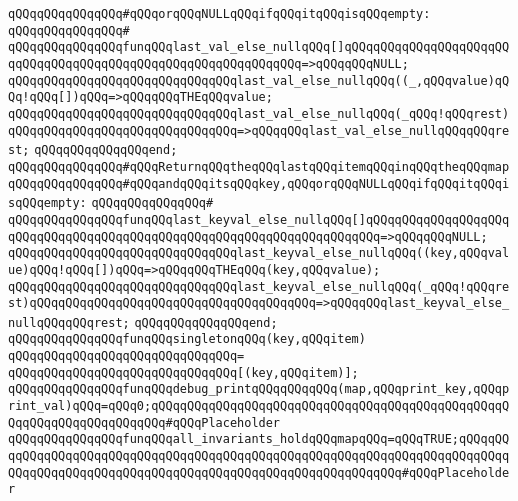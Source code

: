 \verb|qQQqqQQqqQQqqQQq#qQQqorqQQqNULLqQQqifqQQqitqQQqisqQQqempty:|\newline
\verb|qQQqqQQqqQQqqQQq#|\newline
\verb|qQQqqQQqqQQqqQQqfunqQQqlast_val_else_nullqQQq[]qQQqqQQqqQQqqQQqqQQqqQQqqQQqqQQqqQQqqQQqqQQqqQQqqQQqqQQqqQQqqQQq=>qQQqqQQqNULL;|\newline
\verb|qQQqqQQqqQQqqQQqqQQqqQQqqQQqqQQqlast_val_else_nullqQQq((_,qQQqvalue)qQQq!qQQq[])qQQq=>qQQqqQQqTHEqQQqvalue;|\newline
\verb|qQQqqQQqqQQqqQQqqQQqqQQqqQQqqQQqlast_val_else_nullqQQq(_qQQq!qQQqrest)qQQqqQQqqQQqqQQqqQQqqQQqqQQqqQQq=>qQQqqQQqlast_val_else_nullqQQqqQQqrest;|\newline
\verb|qQQqqQQqqQQqqQQqend;|\newline
\newline
\verb|qQQqqQQqqQQqqQQq#qQQqReturnqQQqtheqQQqlastqQQqitemqQQqinqQQqtheqQQqmap|\newline
\verb|qQQqqQQqqQQqqQQq#qQQqandqQQqitsqQQqkey,qQQqorqQQqNULLqQQqifqQQqitqQQqisqQQqempty:|\newline
\verb|qQQqqQQqqQQqqQQq#|\newline
\verb|qQQqqQQqqQQqqQQqfunqQQqlast_keyval_else_nullqQQq[]qQQqqQQqqQQqqQQqqQQqqQQqqQQqqQQqqQQqqQQqqQQqqQQqqQQqqQQqqQQqqQQqqQQqqQQq=>qQQqqQQqNULL;|\newline
\verb|qQQqqQQqqQQqqQQqqQQqqQQqqQQqqQQqlast_keyval_else_nullqQQq((key,qQQqvalue)qQQq!qQQq[])qQQq=>qQQqqQQqTHEqQQq(key,qQQqvalue);|\newline
\verb|qQQqqQQqqQQqqQQqqQQqqQQqqQQqqQQqlast_keyval_else_nullqQQq(_qQQq!qQQqrest)qQQqqQQqqQQqqQQqqQQqqQQqqQQqqQQqqQQqqQQq=>qQQqqQQqlast_keyval_else_nullqQQqqQQqrest;|\newline
\verb|qQQqqQQqqQQqqQQqend;|\newline
\newline
\verb|qQQqqQQqqQQqqQQqfunqQQqsingletonqQQq(key,qQQqitem)|\newline
\verb|qQQqqQQqqQQqqQQqqQQqqQQqqQQqqQQq=|\newline
\verb|qQQqqQQqqQQqqQQqqQQqqQQqqQQqqQQq[(key,qQQqitem)];|\newline
\newline
\verb|qQQqqQQqqQQqqQQqfunqQQqdebug_printqQQqqQQqqQQq(map,qQQqprint_key,qQQqprint_val)qQQq=qQQq0;qQQqqQQqqQQqqQQqqQQqqQQqqQQqqQQqqQQqqQQqqQQqqQQqqQQqqQQqqQQqqQQqqQQqqQQq#qQQqPlaceholder|\newline
\verb|qQQqqQQqqQQqqQQqfunqQQqall_invariants_holdqQQqmapqQQq=qQQqTRUE;qQQqqQQqqQQqqQQqqQQqqQQqqQQqqQQqqQQqqQQqqQQqqQQqqQQqqQQqqQQqqQQqqQQqqQQqqQQqqQQqqQQqqQQqqQQqqQQqqQQqqQQqqQQqqQQqqQQqqQQqqQQqqQQqqQQq#qQQqPlaceholder|\newline
